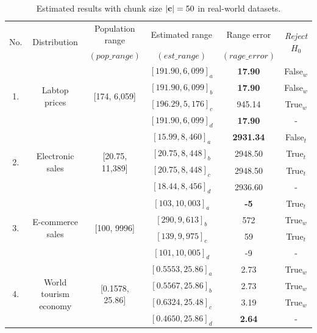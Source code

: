 \documentclass[a4paper,fleqn]{cas-dc}
\begin{document}
\begin{table}[h!]
\centering
\caption{Estimated results with chunk size $|{\bf c}|=50$ in real-world datasets.}
\label{tab:res_realworld2}
\begin{threeparttable}
\begin{tabular}{|c|c|c|c|c|c|}
\hline
\multirow{2}{*}{No.} & \multirow{2}{*}{Distribution} & Population range & 
Estimated range&Range error& \multirow{2}{*}{\it{Reject} $H_0$} \\
&&$(pop\_range)$&$(est\_range)$&$(rage\_error)$& \\
\hline
\multirow{4}{*}{1.} & \multirow{4}{*}{Labtop prices}&\multirow{4}{*}{[174, 6,059]} & $[191.90, 6,099]_a$& 
    \bf{17.90} & False$_w$\\
    &&&$[191.90, 6,099]_b$ & \bf{17.90} &  False$_w$\\
    &&&$[196.29, 5,176]_c$ & 945.14      & True$_w$\\
    &&&$[191.90, 6,099]_d$ & \bf{17.90} &  - \\
\hline
\multirow{4}{*}{2.} & \multirow{4}{*}{Electronic sales}&\multirow{4}{*}{[20.75, 11,389]} & 
$[15.99, 8,460]_a$& 
    \bf{2931.34} &  False$_t$\\
    &&&$[20.75, 8,448]_b$ & 2948.50 &  True$_t$\\
    &&&$[20.75, 8,448]_c$ & 2948.50     & True$_t$\\
    &&&$[18.44, 8,456]_d$ & 2936.60 &  - \\    
\hline
\multirow{4}{*}{3.} & \multirow{4}{*}{E-commerce sales}&\multirow{4}{*}{[100, 9996]} & $[103, 10,003]_a$& 
    \bf{-5} &  True$_t$\\
    &&&$[290, 9,613]_b$ & 572 & True$_w$\\
    &&&$[139, 9,975]_c$ & 59     & True$_t$\\
    &&&$[101, 10,005]_d$ & -9 & - \\    
\hline
\multirow{4}{*}{4.} & \multirow{4}{*}{World tourism economy}&\multirow{4}{*}{[0.1578, 25.86]} & 
$[0.5553, 25.86]_a$& 
    2.73 & True$_w$\\
    &&&$[0.5567, 25.86]_b$ & 2.73 & True$_w$\\
    &&&$[0.6324, 25.48]_c$ & 3.19     & True$_w$\\
    &&&$[0.4650, 25.86]_d$ & \bf{2.64} & - \\    
\bottomrule

\end{tabular}


\end{threeparttable}
\end{table}
\end{document}
